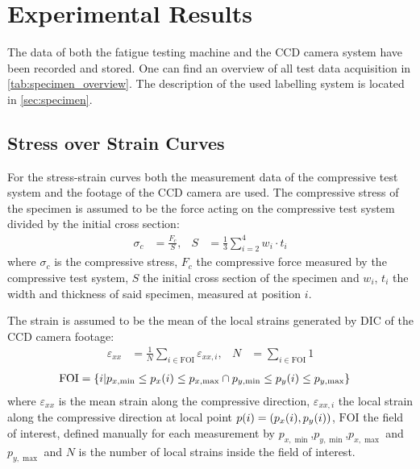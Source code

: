 \chapter{Experimental Results}
\label{chap:\currfilebase}

The data of both the fatigue testing machine and the CCD camera system have been recorded and stored. One can find an overview of all test data acquisition in \autoref{tab:specimen_overview}. The description of the used labelling system is located in \autoref{sec:specimen}.

\section{Stress over Strain Curves}
\label{sec:stress_strain_curves}

For the stress-strain curves both the measurement data of the compressive test system and the footage of the CCD camera are used. The compressive stress of the specimen is assumed to be the force acting on the compressive test system divided by the initial cross section:
\begin{align*}
    \sigma_c &= \frac{F_{c}}{S}, &S &= \frac{1}{3}\sum\limits_{i=2}^4 w_i\cdot t_i
\end{align*}
where $\sigma_c$ is the compressive stress, $F_c$ the compressive force measured by the compressive test system, $S$ the initial cross section of the specimen and $w_i$, $t_i$ the width and thickness of said specimen, measured at position $i$.

The strain is assumed to be the mean of the local strains generated by DIC of the CCD camera footage:
\begin{align*}
    \varepsilon_{xx} &= \frac{1}{N}\sum\limits_{i\in\text{FOI}}\varepsilon_{xx,i}, &N &= \sum\limits_{i\in\text{FOI}}1
\end{align*}
\begin{align*}
    \text{FOI} &= \Bqty{i|p_{x,\min}\leq p_x(i)\leq p_{x,\max} \cap p_{y,\min}\leq p_y(i)\leq p_{y,\max}}
\end{align*}
where $\varepsilon_{xx}$ is the mean strain along the compressive direction, $\varepsilon_{xx,i}$ the local strain along the compressive direction at local point $p(i)=\pqty{p_x(i),p_y(i)}$, $\text{FOI}$ the field of interest, defined manually for each measurement by $p_{x,\min}$,$p_{y,\min}$,$p_{x,\max}$ and $p_{y,\max}$ and $N$ is the number of local strains inside the field of interest.

